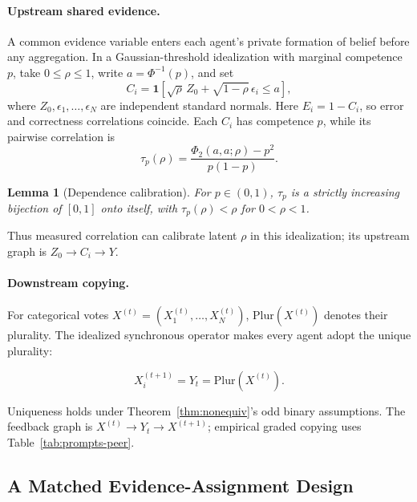 \documentclass[11pt,a4paper]{article}
\newtheorem{lemma}[theorem]{Lemma}
\theoremstyle{definition}
\newcommand{\Plur}{\mathrm{Plur}}
\newcommand{\tetra}{\tau_{p}}
\begin{document}
\paragraph{Upstream shared evidence.}
A common evidence variable enters each agent's private formation of belief
before any aggregation. In a Gaussian-threshold idealization with marginal
competence $p$, take $0\le\rho\le1$, write $a=\Phi^{-1}(p)$, and set
\begin{equation}
C_i=\mathbf{1}\!\left[\sqrt{\rho}\,Z_0+\sqrt{1-\rho}\,\epsilon_i\le a\right],
\label{eq:m1}
\end{equation}
where $Z_0,\epsilon_1,\ldots,\epsilon_N$ are independent standard normals.
Here $E_i=1-C_i$, so error and correctness correlations coincide.
Each $C_i$ has competence $p$, while its pairwise correlation is
\begin{equation}
\tetra(\rho)=\frac{\Phi_2(a,a;\rho)-p^2}{p(1-p)}.
\label{eq:tau}
\end{equation}
\begin{lemma}[Dependence calibration]
\label{lem:calibration}
For $p\in(0,1)$, $\tetra$ is a strictly increasing bijection of $[0,1]$
onto itself, with $\tetra(\rho)<\rho$ for $0<\rho<1$.
\end{lemma}
Thus measured correlation can calibrate latent $\rho$ in this idealization;
its upstream graph is $Z_0\to C_i\to Y$.

\paragraph{Downstream copying.}

For categorical votes $X^{(t)}=(X_1^{(t)},\ldots,X_N^{(t)})$,
$\Plur(X^{(t)})$ denotes their plurality. The idealized synchronous operator
makes every agent adopt the unique plurality:

\begin{equation}
X_i^{(t+1)}=Y_t=\Plur\!\left(X^{(t)}\right).
\label{eq:m2}
\end{equation}

Uniqueness holds under Theorem~\ref{thm:nonequiv}'s odd binary assumptions.
The feedback graph is $X^{(t)}\to Y_t\to X^{(t+1)}$; empirical graded
copying uses Table~\ref{tab:prompts-peer}.

\subsection{A Matched Evidence-Assignment Design}
\label{sec:matched-instrument}
\end{document}
